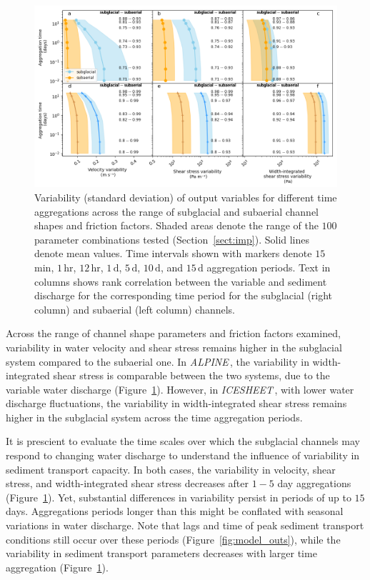 \documentclass[draft]{agujournal2019}
\newcommand{\alpine}{\textit{ALPINE}\,}
\newcommand{\icesheet}{\textit{ICESHEET}\,}
\newcommand{\unit}[1]{$\mathrm{#1}$}
\begin{document}
\begin{figure}[h]
  \centering
    \includegraphics[width=0.9\linewidth]{Fig4.png}
    \caption{Variability (standard deviation) of output variables for different time aggregations across the range of subglacial and subaerial channel shapes and friction factors.
      Shaded areas denote the range of the $100$ parameter combinations tested (Section~\ref{sect:imp}).
      Solid lines denote  mean values.
      Time intervals shown with markers denote $15$\,\unit{min}, $1$\,\unit{hr}, $12$\,\unit{hr}, $1$\,\unit{d}, $5$\,\unit{d}, $10$\,\unit{d}, and $15$\,\unit{d} aggregation periods.
      Text in columns shows rank correlation between the variable and sediment discharge for the corresponding time period for the subglacial (right column) and subaerial (left column) channels.
    }
    \label{fig:multi_run}
  \end{figure}

Across the range of channel shape parameters and friction factors  examined, variability in water velocity and shear stress remains higher in the subglacial system compared to the subaerial one.
In \alpine{}, the variability in width-integrated shear stress is comparable between the two systems, due to the variable water discharge (Figure~\ref{fig:multi_run}).
However, in \icesheet{}, with lower water discharge fluctuations, the variability in width-integrated shear stress remains higher in the subglacial system across the time aggregation periods.

It is prescient to evaluate the time scales over which the subglacial channels may respond to changing water discharge to understand the influence of variability in sediment transport capacity.
In both cases, the variability in velocity, shear stress, and width-integrated shear stress decreases after $1-5$ day aggregations (Figure~\ref{fig:multi_run}).
Yet, substantial differences in variability persist in periods of up to $15$ days.
Aggregations periods longer than this might be conflated with seasonal variations in water discharge.
Note that lags and time of peak sediment transport conditions still occur over these periods (Figure~\ref{fig:model_outs}), while the variability in sediment transport parameters decreases with larger time aggregation (Figure~\ref{fig:multi_run}).
\end{document}
